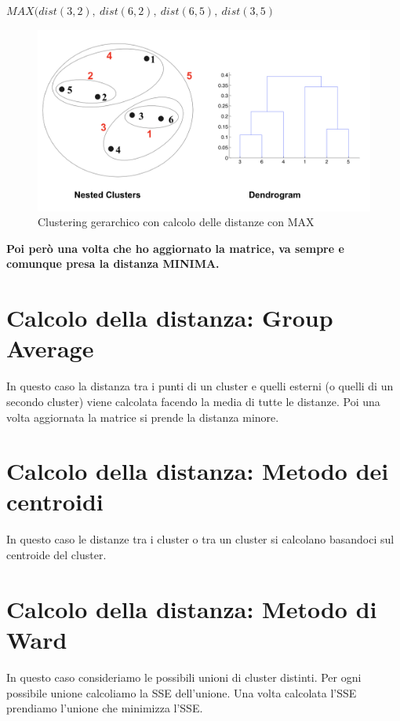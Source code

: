 \documentclass[14pt]{extreport}
\begin{document}
$MAX(dist(3,2), \ dist(6,2), \ dist(6,5), \ dist(3,5)$


\begin{figure}[H]
  \centering\includegraphics[width=\linewidth]{MAX.png}
  \caption{Clustering gerarchico con calcolo delle distanze con MAX}
\end{figure}

{\bf Poi però una volta che ho aggiornato la matrice, va sempre e comunque presa la distanza MINIMA.}

\section{Calcolo della distanza: Group Average}

In questo caso la distanza tra i punti di un cluster e quelli esterni (o quelli di un secondo cluster) viene calcolata facendo la media di tutte le distanze.
Poi una volta aggiornata la matrice si prende la distanza minore.

\section{Calcolo della distanza: Metodo dei centroidi}

In questo caso le distanze tra i cluster o tra un cluster si calcolano basandoci sul centroide del cluster.

\section{Calcolo della distanza: Metodo di Ward}

In questo caso consideriamo le possibili unioni di cluster distinti. Per ogni possibile unione calcoliamo la SSE dell'unione. Una volta calcolata l'SSE prendiamo l'unione che minimizza l'SSE.
\end{document}
